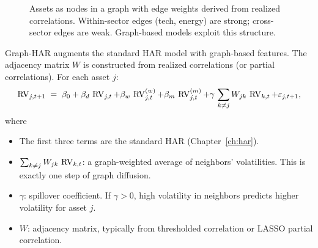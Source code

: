\begin{figure}[ht]
\centering
{}
\caption{Assets as nodes in a graph with edge weights derived from realized
correlations. Within-sector edges (tech, energy) are strong; cross-sector edges
are weak. Graph-based models exploit this structure.}
\label{fig:asset-graph}
\end{figure}

\begin{keyidea}
Graph-HAR augments the standard HAR model with graph-based features. The
adjacency matrix $W$ is constructed from realized correlations (or partial
correlations). For each asset $j$:
\begin{equation}\label{eq:graph-har}
  \operatorname{RV}_{j,t+1} \;=\; \beta_0 + \beta_d\,\operatorname{RV}_{j,t}
  + \beta_w\,\operatorname{RV}_{j,t}^{(w)}
  + \beta_m\,\operatorname{RV}_{j,t}^{(m)}
  + \gamma\, \sum_{k \neq j} W_{jk}\,\operatorname{RV}_{k,t}
  + \varepsilon_{j,t+1},
\end{equation}
where
\begin{itemize}[nosep]
  \item The first three terms are the standard HAR (Chapter~\ref{ch:har}).
  \item $\sum_{k \neq j} W_{jk}\,\operatorname{RV}_{k,t}$: a graph-weighted average of
        neighbors' volatilities. This is exactly one step of graph diffusion.
  \item $\gamma$: spillover coefficient. If $\gamma > 0$, high volatility in
        neighbors predicts higher volatility for asset $j$.
  \item $W$: adjacency matrix, typically from thresholded correlation or LASSO
        partial correlation.
\end{itemize}
\end{keyidea}

